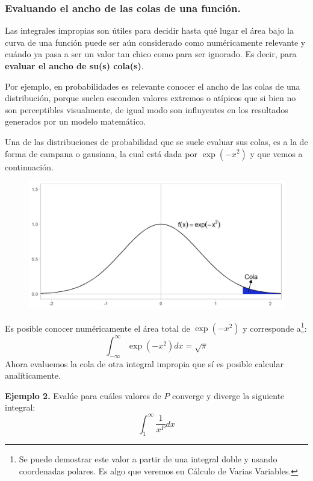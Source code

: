 \documentclass[12pt]{article}
\begin{document}
\subsubsection{Evaluando el ancho de las colas de una función.}

Las integrales impropias son útiles para decidir hasta qué lugar el área bajo la curva de una función puede ser aún considerado como numéricamente relevante y cuándo ya pasa a ser un valor tan chico como para ser ignorado. Es decir, para \textbf{evaluar el ancho de su(s) cola(s)}.

Por ejemplo, en probabilidades es relevante conocer el ancho de las colas de una distribución, porque suelen esconden valores extremos o atípicos que si bien no son perceptibles visualmente, de igual modo son influyentes en los resultados generados por un modelo matemático.

Una de las distribuciones de probabilidad que se suele evaluar sus colas, es a la de forma de campana o gausiana, la cual está dada por $\exp(-x^{2})$ y que vemos a continuación.

\begin{figure}[hbt!]
\centering
\includegraphics[scale=0.7]{bell-curve-tail.jpg}
\end{figure}

Es posible conocer numéricamente el área total de $\exp(-x^{2})$ y corresponde a\footnote{Se puede demostrar este valor a partir de una integral doble y usando coordenadas polares. Es algo que veremos en Cálculo de Varias Variables.}:
\[
  \int_{-\infty}^{\infty} \exp(-x^{2})dx = \sqrt{\pi}
\]
Ahora evaluemos la cola de otra integral impropia que sí es posible calcular analíticamente.

\textbf{Ejemplo 2.} Evalúe para cuáles valores de $P$ converge y diverge la siguiente integral:
\[
  \int_{1}^{\infty} \frac{1}{x^{P}} dx
\]

\newpage
\end{document}
